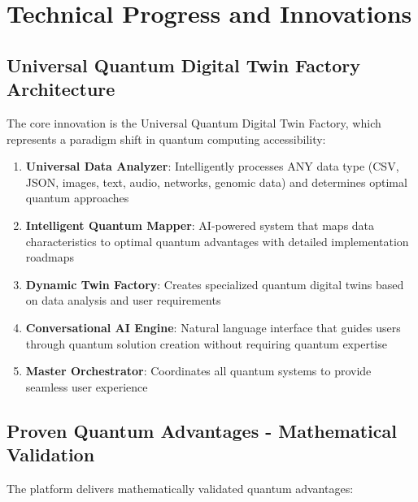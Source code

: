 \documentclass[12pt,a4paper]{article}
\begin{document}
\section{Technical Progress and Innovations}

\subsection{Universal Quantum Digital Twin Factory Architecture}

The core innovation is the Universal Quantum Digital Twin Factory, which represents a paradigm shift in quantum computing accessibility:

\begin{enumerate}
    \item \textbf{Universal Data Analyzer}: Intelligently processes ANY data type (CSV, JSON, images, text, audio, networks, genomic data) and determines optimal quantum approaches
    
    \item \textbf{Intelligent Quantum Mapper}: AI-powered system that maps data characteristics to optimal quantum advantages with detailed implementation roadmaps
    
    \item \textbf{Dynamic Twin Factory}: Creates specialized quantum digital twins based on data analysis and user requirements
    
    \item \textbf{Conversational AI Engine}: Natural language interface that guides users through quantum solution creation without requiring quantum expertise
    
    \item \textbf{Master Orchestrator}: Coordinates all quantum systems to provide seamless user experience
\end{enumerate}

\subsection{Proven Quantum Advantages - Mathematical Validation}

The platform delivers mathematically validated quantum advantages:
\end{document}
